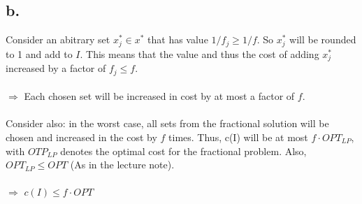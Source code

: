 \documentclass{article}
\begin{document}
\pagebreak
\subsection*{b.}
Consider an abitrary set $x^{*}_{j} \in x^*$ that has value $1 / f_j \geq 1 / f$. So $x^{*}_{j}$ will be rounded to 1 and add to $I$. This means that the value and thus the cost of adding $x^{*}_{j}$ increased by a factor of $f_{j} \leq f$.  \\\\
$\Rightarrow$ Each chosen set will be increased in cost by at most a factor of $f$. \\\\ 
Consider also: in the worst case, all sets from the fractional solution will be chosen and increased in the cost by $f$ times. Thus, c(I) will be at most $f \cdot OPT_{LP}$, with $OTP_{LP}$ denotes the optimal cost for the fractional problem. Also, $OPT_{LP} \leq OPT$ (As in the lecture note). \\\\
$\Rightarrow$ $c(I) \leq f \cdot OPT$  
\end{document}
